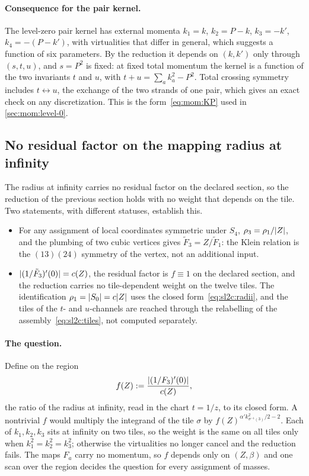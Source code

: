 \paragraph{Consequence for the pair kernel.}
The level-zero pair kernel has external momenta $k_1 = k$, $k_2 = P - k$, $k_3 = - k'$, $k_4 = - (P - k')$, with virtualities that differ in general, which suggests a function of six parameters.
By the reduction it depends on $(k, k')$ only through $(s, t, u)$, and $s = P^2$ is fixed: at fixed total momentum the kernel is a function of the two invariants $t$ and $u$, with $t + u = \sum_a k_a^2 - P^2$.
Total crossing symmetry includes $t \leftrightarrow u$, the exchange of the two strands of one pair, which gives an exact check on any discretization.
This is the form~\eqref{eq:mom:KP} used in \cref{sec:mom:level-0}.

\subsection{No residual factor on the mapping radius at infinity}
\label{sec:sl2c:rho3}

The radius at infinity carries no residual factor on the declared section, so the reduction of the previous section holds with no weight that depends on the tile.
Two statements, with different statuses, establish this.
\begin{itemize}
  \item For any assignment of local coordinates symmetric under $S_4$, $\rho_3 = \rho_1 / {|Z|}$, and the plumbing of two cubic vertices gives $\tilde F_3 = Z / \tilde F_1$: the Klein relation is the $(13)(24)$ symmetry of the vertex, not an additional input. 
  \item ${|(1 / \tilde F_3)'(0)|} = c(Z)$, the residual factor is $f \equiv 1$ on the declared section, and the reduction carries no tile-dependent weight on the twelve tiles. 
    The identification $\rho_1 = {|S_0|} = c {|Z|}$ uses the closed form~\eqref{eq:sl2c:radii}, and the tiles of the $t$- and $u$-channels are reached through the relabelling of the assembly~\eqref{eq:sl2c:tiles}, not computed separately.
\end{itemize}

\paragraph{The question.}
Define on the region
\begin{equation}
  f(Z)
    := \frac{{|(1 / F_3)'(0)|}}{c(Z)},
\end{equation}
the ratio of the radius at infinity, read in the chart $t = 1 / z$, to its closed form.
A nontrivial $f$ would multiply the integrand of the tile $\sigma$ by $f(Z)^{\alpha' k_{\sigma^{-1}(3)}^2 / 2 - 2}$.
Each of $k_1, k_2, k_3$ sits at infinity on two tiles, so the weight is the same on all tiles only when $k_1^2 = k_2^2 = k_3^2$; otherwise the virtualities no longer cancel and the reduction fails.
The maps $F_a$ carry no momentum, so $f$ depends only on $(Z, \beta)$ and one scan over the region decides the question for every assignment of masses.

